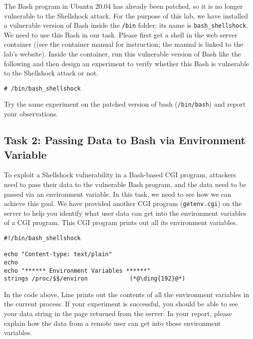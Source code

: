 The Bash program in Ubuntu 20.04 has already been patched, so it is no
longer vulnerable to the Shellshock attack. For the purpose of this lab, we
have installed a vulnerable version of Bash inside the \texttt{/bin}
folder; its name is \texttt{bash\_shellshock}. We need to use 
this Bash in our task. Please first get a shell in the 
web server container ((see the container manual for
instruction; the manual is linked to the lab's website).
Inside the container, run this vulnerable version of Bash like the
following and then design an experiment to verify whether this Bash is
vulnerable to the Shellshock attack or not. 

\begin{lstlisting}
# /bin/bash_shellshock
\end{lstlisting}

Try the same experiment on the patched version of bash (\texttt{/bin/bash})
and report your observations.


\subsection{Task 2: Passing Data to Bash via Environment Variable}


To exploit a Shellshock vulnerability in a Bash-based CGI program, attackers need to 
pass their data to the vulnerable Bash program, and the data need to be
passed via an environment variable. In this task, we need to see how we can
achieve this goal. We have provided another CGI program (\texttt{getenv.cgi}) on the 
server to help you identify what user data can get into the environment
variables of a CGI program. This CGI program prints out all
its environment variables. 


\begin{lstlisting}[caption=\texttt{getenv.cgi}]
#!/bin/bash_shellshock             

echo "Content-type: text/plain"
echo
echo "****** Environment Variables ******"
strings /proc/$$/environ            (*@\ding{192}@*)
\end{lstlisting}


In the code above, Line  prints out the contents of all the
environment variables in the current process. If your experiment is
successful, you should be able to see your data string in the page returned
from the server. 
In your report, please explain how the data from a remote user can get into
those environment variables. 


